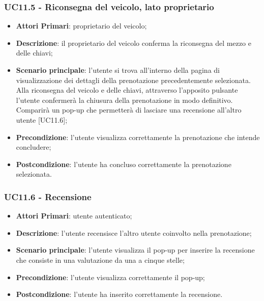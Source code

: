 \subsubsection{UC11.5 - Riconsegna del veicolo, lato proprietario}
\begin{itemize}
	\item \textbf{Attori Primari}: proprietario del veicolo;
	\item \textbf{Descrizione}: il proprietario del veicolo conferma la riconsegna del mezzo e delle chiavi;
	\item \textbf{Scenario principale}: l'utente si trova all'interno della pagina di visualizzazione dei dettagli della prenotazione precedentemente selezionata. Alla riconsegna del veicolo e delle chiavi, attraverso l'apposito pulsante l'utente confermerà la chiusura della prenotazione in modo definitivo. Comparirà un pop-up che permetterà di lasciare una recensione all'altro utente [UC11.6];
	\item \textbf{Precondizione}: l'utente visualizza correttamente la prenotazione che intende concludere;
	\item \textbf{Postcondizione}: l'utente ha concluso correttamente la prenotazione selezionata.
\end{itemize}

\subsubsection{UC11.6 - Recensione}
\begin{itemize}
	\item \textbf{Attori Primari}: utente autenticato;
	\item \textbf{Descrizione}: l'utente recensisce l'altro utente coinvolto nella prenotazione;
	\item \textbf{Scenario principale}: l'utente visualizza il pop-up per inserire la recensione che consiste in una valutazione da una a cinque stelle;
	\item \textbf{Precondizione}: l'utente visualizza correttamente il pop-up;
	\item \textbf{Postcondizione}: l'utente ha inserito correttamente la recensione.
\end{itemize}

